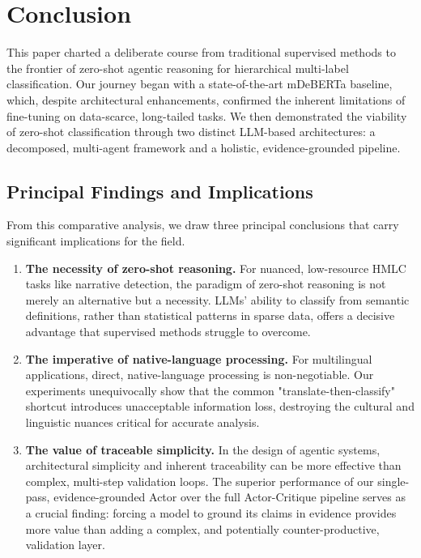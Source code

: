 \chapter{Conclusion}

This paper charted a deliberate course from traditional supervised methods to the frontier of zero-shot agentic reasoning for hierarchical multi-label classification. Our journey began with a state-of-the-art mDeBERTa baseline, which, despite architectural enhancements, confirmed the inherent limitations of fine-tuning on data-scarce, long-tailed tasks. We then demonstrated the viability of zero-shot classification through two distinct LLM-based architectures: a decomposed, multi-agent framework and a holistic, evidence-grounded pipeline.

\section{Principal Findings and Implications}

From this comparative analysis, we draw three principal conclusions that carry significant implications for the field. 
\begin{enumerate}
    \item \textbf{The necessity of zero-shot reasoning.} For nuanced, low-resource HMLC tasks like narrative detection, the paradigm of zero-shot reasoning is not merely an alternative but a necessity. LLMs' ability to classify from semantic definitions, rather than statistical patterns in sparse data, offers a decisive advantage that supervised methods struggle to overcome.

    \item \textbf{The imperative of native-language processing.} For multilingual applications, direct, native-language processing is non-negotiable. Our experiments unequivocally show that the common "translate-then-classify" shortcut introduces unacceptable information loss, destroying the cultural and linguistic nuances critical for accurate analysis.

    \item \textbf{The value of traceable simplicity.} In the design of agentic systems, architectural simplicity and inherent traceability can be more effective than complex, multi-step validation loops. The superior performance of our single-pass, evidence-grounded Actor over the full Actor-Critique pipeline serves as a crucial finding: forcing a model to ground its claims in evidence provides more value than adding a complex, and potentially counter-productive, validation layer.
\end{enumerate}

